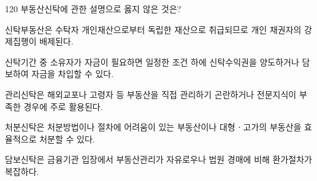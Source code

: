 \begin{question}{120}
부동산신탁에 관한 설명으로 옳지 않은 것은?
\begin{choices}
  \item 신탁부동산은 수탁자 개인재산으로부터 독립한 재산으로 취급되므로 개인 채권자의 강제집행이 배제된다.
  \item 신탁기간 중 소유자가 자금이 필요하면 일정한 조건 하에 신탁수익권을 양도하거나 담보하여 자금을 차입할 수 있다.
  \item 관리신탁은 해외교포나 고령자 등 부동산을 직접 관리하기 곤란하거나 전문지식이 부족한 경우에 주로 활용된다.
  \item 처분신탁은 처분방법이나 절차에 어려움이 있는 부동산이나 대형ㆍ고가의 부동산을 효율적으로 처분할 수 있다.
  \item 담보신탁은 금융기관 입장에서 부동산관리가 자유로우나 법원 경매에 비해 환가절차가 복잡하다.
\end{choices}
\end{question}
